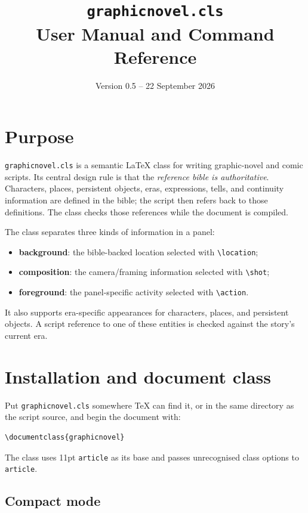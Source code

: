 \documentclass[11pt]{article}
\title{\texttt{graphicnovel.cls}\\User Manual and Command Reference}
\author{Version 0.5 -- 22 September 2026}
\date{}
\newcommand{\gnclass}{\texttt{graphicnovel.cls}}
\newcommand{\cmd}[1]{\texttt{\textbackslash#1}}
\begin{document}
\maketitle
\tableofcontents
\clearpage

\section{Purpose}

\gnclass{} is a semantic LaTeX class for writing graphic-novel and comic scripts. Its central design rule is that the \emph{reference bible is authoritative}. Characters, places, persistent objects, eras, expressions, tells, and continuity information are defined in the bible; the script then refers back to those definitions. The class checks those references while the document is compiled.

The class separates three kinds of information in a panel:
\begin{itemize}
  \item \textbf{background}: the bible-backed location selected with \cmd{location};
  \item \textbf{composition}: the camera/framing information selected with \cmd{shot};
  \item \textbf{foreground}: the panel-specific activity selected with \cmd{action}.
\end{itemize}

It also supports era-specific appearances for characters, places, and persistent objects. A script reference to one of these entities is checked against the story's current era.

\section{Installation and document class}

Put \gnclass{} somewhere TeX can find it, or in the same directory as the script source, and begin the document with:

\begin{lstlisting}
\documentclass{graphicnovel}
\end{lstlisting}

The class uses 11pt \texttt{article} as its base and passes unrecognised class options to \texttt{article}.

\subsection{Compact mode}
\end{document}
